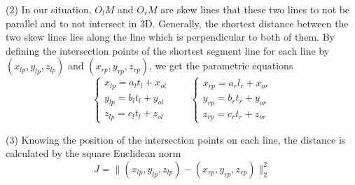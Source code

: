 \documentclass[journal,article,submit,moreauthors,pdftex,10pt,a4paper]{mdpi}
\begin{document}
(2) In our situation, $O_lM$ and $O_rM$ are skew lines that these two lines to not be parallel and to not intersect in 3D. Generally, the shortest distance between the two skew lines lies along the line which is perpendicular to both of them. By defining the intersection points of the shortest segment line for each line by $(x_{lp}, y_{lp}, z_{lp})$ and $(x_{rp}, y_{rp}, z_{rp})$, we get the parametric equations
\begin{equation}  
\left\{ 
\begin{array}{lll} 
x_{lp} = a_l t_l + x_{ol} \\
y_{lp} = b_l t_l + y_{ol} \\
z_{lp} = c_l t_l + z_{ol}
\end{array} 
\right.
\qquad
\left\{ 
\begin{array}{lll} 
x_{rp} = a_r l_r + x_{or} \\
y_{rp} = b_r t_r + y_{or} \\
z_{rp} = c_r t_r + z_{or}
\end{array} 
\right.
\end{equation}

(3) Knowing the position of the intersection points on each line, the distance is calculated by the square Euclidean norm 
\begin{equation}
J = \|(x_{lp}, y_{lp}, z_{lp}) - (x_{rp}, y_{rp}, z_{rp}) \|_2^2
\end{equation}
\end{document}
